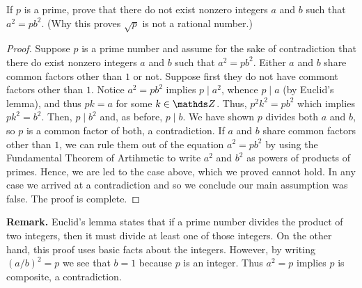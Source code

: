 \begin{questions}
\question
    If \(p\) is a prime, prove that there do not exist nonzero integers \(a\) and \(b\) such that \(a^2=p b^2\). (Why this proves  \(\sqrt{p}\) is not a rational number.)
\renewcommand{\solutiontitle}{}
    \begin{solution}%
    \vspace*{-\baselineskip}
    \begin{proof}
    Suppose \(p\) is a prime number and assume for the sake of contradiction that there do exist nonzero integers \(a\) and \(b\) such that \(a^2=p b^2\).
    Either \(a\) and \(b\) share common factors other than \(1\) or not.
%
    Suppose first they do not have commont factors other than \(1\).
    Notice \(a^2=p b^2\) implies \(p\mid a^2\), whence \(p\mid a\) (by Euclid's lemma), and thus  \(pk = a\) for some \(k\in \Z\). Thus, \(p^2k^2 = p b^2\) which implies \(p k^2 = b^2\). Then,  \(p\mid b^2\) and, as before,  \(p\mid b\). We have shown \(p\) divides both \(a\) and \(b\), so \(p\) is a common factor of both, a contradiction.
%
    If \(a\) and \(b\) share common factors other than \(1\), we can rule them out of the equation \(a^2=p b^2\) by using the Fundamental Theorem of Artihmetic to write \(a^2\) and \(b^2\) as powers of products of primes. Hence, we are led to the case above, which we proved cannot hold. 
%
    In any case we arrived at a contradiction and so we conclude our main assumption was false. The proof is complete.
    \end{proof}

    \textbf{Remark.} Euclid's lemma states that if a prime number divides the product of two integers, then it must divide at least one of those integers. On the other hand, this proof uses basic facts about the integers. However, by writing \((a/b)^2 = p\) we see that \(b=1\) because \(p\) is an integer. Thus \(a^2 = p\) implies \(p\) is composite, a contradiction.
\end{solution}
\renewcommand{\solutiontitle}{\noindent\textbf{Solution.} }



\end{questions}

